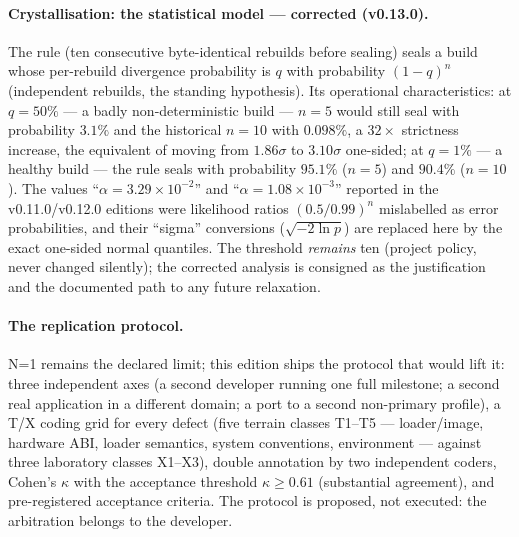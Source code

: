 \documentclass[11pt,a4paper]{article}
\begin{document}
\paragraph{Crystallisation: the statistical model --- corrected (v0.13.0).}
The rule (ten consecutive byte-identical rebuilds before sealing) seals
a build whose per-rebuild divergence probability is $q$ with probability
$(1-q)^n$ (independent rebuilds, the standing hypothesis). Its
operational characteristics: at $q = 50\%$ --- a badly
non-deterministic build --- $n = 5$ would still seal with probability
$3.1\%$ and the historical $n = 10$ with $0.098\%$, a $32\times$
strictness increase, the equivalent of moving from $1.86\sigma$ to
$3.10\sigma$ one-sided; at $q = 1\%$ --- a healthy build --- the rule
seals with probability $95.1\%$ ($n{=}5$) and $90.4\%$ ($n{=}10$). The
values ``$\alpha = 3.29\times10^{-2}$'' and ``$\alpha = 1.08\times
10^{-3}$'' reported in the v0.11.0/v0.12.0 editions were likelihood
ratios $(0.5/0.99)^n$ mislabelled as error probabilities, and their
``sigma'' conversions ($\sqrt{-2\ln p}$) are replaced here by the exact
one-sided normal quantiles. The threshold \emph{remains} ten (project
policy, never changed silently); the corrected analysis is consigned as
the justification and the documented path to any future relaxation.

\paragraph{The replication protocol.} N=1 remains the declared limit;
this edition ships the protocol that would lift it: three independent
axes (a second developer running one full milestone; a second real
application in a different domain; a port to a second non-primary
profile), a T/X coding grid for every defect (five terrain classes T1--T5
--- loader/image, hardware ABI, loader semantics, system conventions,
environment --- against three laboratory classes X1--X3), double
annotation by two independent coders, Cohen's $\kappa$ with the
acceptance threshold $\kappa \ge 0.61$ (substantial agreement), and
pre-registered acceptance criteria. The protocol is proposed, not
executed: the arbitration belongs to the developer.

\end{document}

